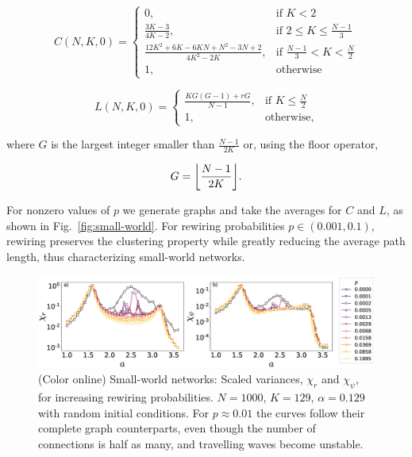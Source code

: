 \begin{equation}
C(N,K,0)=
\begin{cases}
    0 ,                                      & \text{if } K<2 \\
    \frac{3K-3}{4K-2},                       & \text{if } 2 \leq K \leq
    \frac{N-1}{3} \\
    \frac{12K^2+6K-6KN+N^2-3N+2}{4K^2-2K},   & \text{if } \frac{N-1}{3} < K <
    \frac{N}{2} \\
    1,                                       & \text{otherwise}
\end{cases}
\end{equation}

\begin{equation}
L(N,K,0)=
\begin{cases}
    \frac{KG(G-1) + rG}{N-1}, & \text{if } K \leq \frac{N}{2} \\
    1,                        & \text{otherwise},
\end{cases}
\end{equation}

\noindent where $G$ is the largest integer smaller than $\frac{N-1}{2K}$ or,
using the floor operator,

\begin{equation*}
    G = \floor*{\frac{N-1}{2K}} .
\end{equation*}

For nonzero values of $p$ we generate graphs and take the averages for $C$ and $L$, as shown in Fig.~\ref{fig:small-world}. For
rewiring probabilities $p \in \left( 0.001, 0.1 \right)$, rewiring preserves the clustering property while greatly reducing the average
path length, thus characterizing small-world networks.

\begin{figure}
\begin{center}
    \includegraphics[width=1.\textwidth]{fig/chi_curves_pvalue.eps}
    \caption{\label{fig:chicurvespvalue} (Color online) Small-world networks: Scaled variances, $\chi_r$ and $\chi_{\psi}$, for
    increasing rewiring probabilities. $N=1000$, $K=129$, $\alpha=0.129$ with random initial conditions. For $p \approx 0.01$ the
curves follow their complete graph counterparts, even though the number of connections is half as many, and travelling waves become
unstable.  }
\end{center}
\end{figure}

